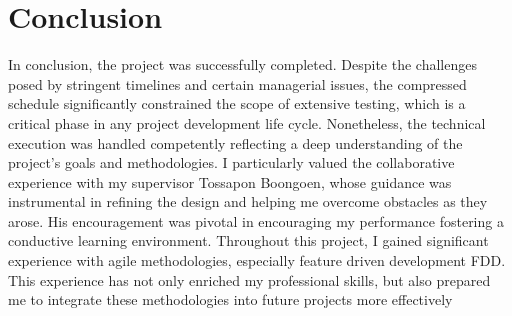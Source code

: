 \section{Conclusion}\label{sec:conclusion}

In conclusion, the project was successfully completed.
Despite the challenges posed by stringent timelines and certain managerial issues,
the compressed schedule significantly constrained the scope of extensive testing, which is a critical phase in any project development life cycle.
Nonetheless, the technical execution was handled competently reflecting a deep understanding of the project's goals and methodologies.
I particularly valued the collaborative experience with my supervisor Tossapon Boongoen, whose guidance was instrumental in refining the design and helping me overcome obstacles as they arose.
His encouragement was pivotal in encouraging my performance fostering a conductive learning environment.
Throughout this project,
I gained significant experience with agile methodologies, especially feature driven development FDD\@.
This experience has not only enriched my professional skills,
but also prepared me to integrate these methodologies into future projects more effectively

